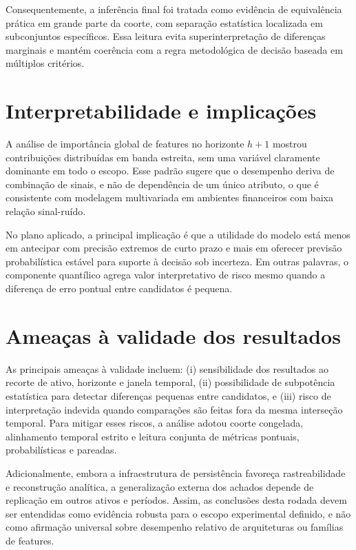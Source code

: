 Consequentemente, a inferência final foi tratada como evidência de equivalência prática em grande parte da coorte, com separação estatística localizada em subconjuntos específicos. Essa leitura evita superinterpretação de diferenças marginais e mantém coerência com a regra metodológica de decisão baseada em múltiplos critérios.

\section{Interpretabilidade e implicações}
A análise de importância global de features no horizonte \(h+1\) mostrou contribuições distribuídas em banda estreita, sem uma variável claramente dominante em todo o escopo. Esse padrão sugere que o desempenho deriva de combinação de sinais, e não de dependência de um único atributo, o que é consistente com modelagem multivariada em ambientes financeiros com baixa relação sinal-ruído.

No plano aplicado, a principal implicação é que a utilidade do modelo está menos em antecipar com precisão extremos de curto prazo e mais em oferecer previsão probabilística estável para suporte à decisão sob incerteza. Em outras palavras, o componente quantílico agrega valor interpretativo de risco mesmo quando a diferença de erro pontual entre candidatos é pequena.

\section{Ameaças à validade dos resultados}
As principais ameaças à validade incluem: (i) sensibilidade dos resultados ao recorte de ativo, horizonte e janela temporal, (ii) possibilidade de subpotência estatística para detectar diferenças pequenas entre candidatos, e (iii) risco de interpretação indevida quando comparações são feitas fora da mesma interseção temporal. Para mitigar esses riscos, a análise adotou coorte congelada, alinhamento temporal estrito e leitura conjunta de métricas pontuais, probabilísticas e pareadas.

Adicionalmente, embora a infraestrutura de persistência favoreça rastreabilidade e reconstrução analítica, a generalização externa dos achados depende de replicação em outros ativos e períodos. Assim, as conclusões desta rodada devem ser entendidas como evidência robusta para o escopo experimental definido, e não como afirmação universal sobre desempenho relativo de arquiteturas ou famílias de features.
